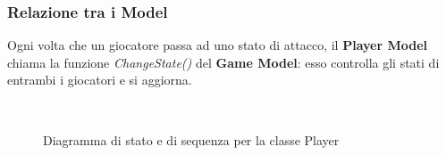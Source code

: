 \documentclass[a4paper,11pt]{article}
\begin{document}
\subsubsection{Relazione tra i Model}
Ogni volta che un giocatore passa ad uno stato di attacco, il \textbf{Player Model} chiama la funzione \emph{ChangeState()} del \textbf{Game Model}: esso controlla gli stati di entrambi i giocatori e si aggiorna.
\begin{figure}[!h]
\caption{Diagramma di stato e di sequenza per la classe Player}
\ \\\noindent{}
\end{figure}
\end{document}
